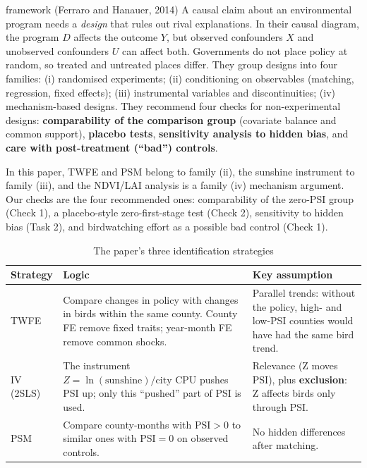 \documentclass[11pt]{article}
\begin{document}
\begin{conceptbox}{framework (Ferraro and Hanauer, 2014)}
A causal claim about an environmental program needs a \emph{design} that rules out rival explanations. In their causal diagram, the program $D$ affects the outcome $Y$, but observed confounders $X$ and unobserved confounders $U$ can affect both. Governments do not place policy at random, so treated and untreated places differ. They group designs into four families: (i) randomised experiments; (ii) conditioning on observables (matching, regression, fixed effects); (iii) instrumental variables and discontinuities; (iv) mechanism-based designs. They recommend four checks for non-experimental designs: \textbf{comparability of the comparison group} (covariate balance and common support), \textbf{placebo tests}, \textbf{sensitivity analysis to hidden bias}, and \textbf{care with post-treatment (``bad'') controls}.

In this paper, TWFE and PSM belong to family (ii), the sunshine instrument to family (iii), and the NDVI/LAI analysis is a family (iv) mechanism argument. Our checks are the four recommended ones: comparability of the zero-PSI group (Check 1), a placebo-style zero-first-stage test (Check 2), sensitivity to hidden bias (Task 2), and birdwatching effort as a possible bad control (Check 1).
\end{conceptbox}

\begin{table}[H]\centering\small
\caption{The paper's three identification strategies}
\begin{tabularx}{\linewidth}{l>{\raggedright\arraybackslash}X>{\raggedright\arraybackslash}X}
\toprule
Strategy & Logic & Key assumption\\
\midrule
TWFE & Compare changes in policy with changes in birds within the same county. County FE remove fixed traits; year-month FE remove common shocks. & Parallel trends: without the policy, high- and low-PSI counties would have had the same bird trend.\\
IV (2SLS) & The instrument $Z=\ln(\text{sunshine})/\text{city CPU}$ pushes PSI up; only this ``pushed'' part of PSI is used. & Relevance (Z moves PSI), plus \textbf{exclusion}: Z affects birds only through PSI.\\
PSM & Compare county-months with PSI$>0$ to similar ones with PSI$=0$ on observed controls. & No hidden differences after matching.\\
\bottomrule
\end{tabularx}
\end{table}
\end{document}
